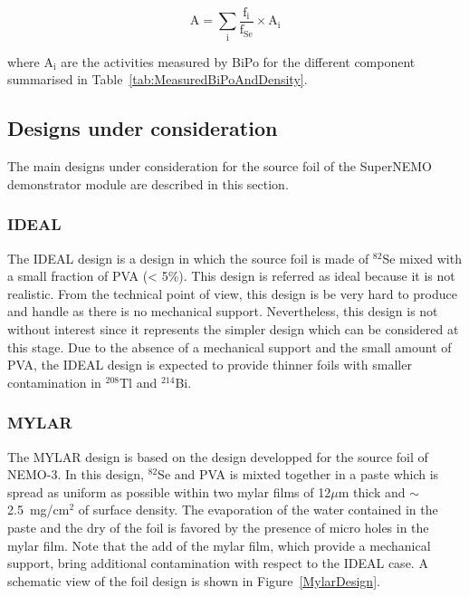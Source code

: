 \documentclass[main.tex]{subfiles}
\begin{document}
\begin{equation}\label{eq:ActivityComponent}
\text{A} = \sum_\text{i} \frac{\text{f}_\text{i}}{\text{f}_{\text{Se}}} \times \text{A}_\text{i}
\end{equation}


\NI where A$_\text{i}$ are the activities measured by BiPo for the different component summarised in Table~\ref{tab:MeasuredBiPoAndDensity}.


\subsection{Designs under consideration}\label{sec:designUnderConsideration}


\NI The main designs under consideration for the source foil of the SuperNEMO demonstrator module are described in this section. 


\subsubsection{IDEAL}


\NI The IDEAL design is a design in which the source foil is made of $^{\text{82}}$Se mixed with a small fraction of PVA (< 5\%). This design is referred as ideal because it is not realistic. From the technical point of view, this design is be very hard to produce and handle as there is no mechanical support. Nevertheless, this design is not without interest since it represents the simpler design which can be considered at this stage. Due to the absence of a mechanical support and the small amount of PVA, the IDEAL design is expected to provide thinner foils with smaller contamination in $^{\text{208}}$Tl and $^{\text{214}}$Bi.


\subsubsection{MYLAR}


\NI The MYLAR design is based on the design developped for the source foil of NEMO-3. In this design, $^{\text{82}}$Se and PVA is mixted together in a paste which is spread as uniform as possible within two mylar films of 12$\mu$m thick and $\sim$2.5~mg/cm$^\text{2}$ of surface density. The evaporation of the water contained in the paste and the dry of the foil is favored by the presence of micro holes in the mylar film. Note that the add of the mylar film, which provide a mechanical support, bring additional contamination with respect to the IDEAL case. A schematic view of the foil design is shown in Figure~\ref{MylarDesign}.
\end{document}
